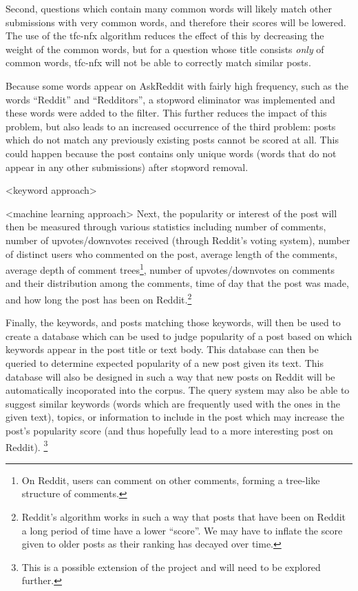 \documentclass{acm_proc_article-sp}
\begin{document}
Second, questions which contain many common words will likely match other submissions with very common words, and therefore their
scores will be lowered.  The use of the tfc-nfx algorithm reduces the effect of this by decreasing the weight of the common words, but
for a question whose title consists \emph{only} of common words, tfc-nfx will not be able to correctly match similar posts.

Because some words appear on AskReddit with fairly high frequency, such as the words ``Reddit'' and ``Redditors'', a stopword eliminator
was implemented and these words were added to the filter.  This further reduces the impact of this problem, but also leads to an increased
occurrence of the third problem: posts which do not match any previously existing posts cannot be scored at all.  This could happen
because the post contains only unique words (words that do not appear in any other submissions) after stopword removal.

<keyword approach>

<machine learning approach>
Next, the popularity or interest of the post will then be measured through various statistics including
number of comments, number of upvotes/downvotes received (through Reddit's voting system), number
of distinct users who commented on the post, average length of the comments, average depth of
comment trees\footnote{On Reddit, users can comment on other comments, forming a tree-like structure of comments.},
number of upvotes/downvotes on comments and their distribution among the comments, time of day that the post was made,
and how long the post has been on Reddit.\footnote{Reddit's algorithm works in such a way that posts that have been on Reddit
a long period of time have a lower ``score''. We may have to inflate the score given to older posts as their ranking
has decayed over time.}

Finally, the keywords, and posts matching those keywords, will then be used to create a database which
can be used to judge popularity of a post based on which keywords appear in the post title or text
body.  This database can then be queried to determine expected popularity of a new post given its
text.  This database will also be designed in such a way that new posts on Reddit will be automatically
incoporated into the corpus.
The query system may also be able to suggest similar keywords (words which are frequently used with
the ones in the given text), topics, or information to include in the post which may increase
the post's popularity score (and thus hopefully lead to a more interesting post on Reddit).
\footnote{This is a possible extension of the project and will need to be explored further.}
\end{document}
